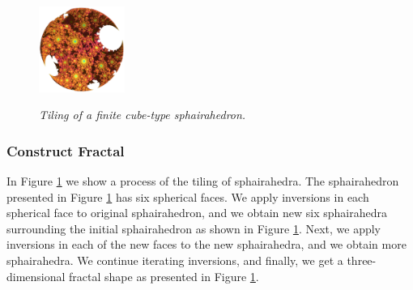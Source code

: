 \begin{figure}[H]
\begin{minipage}[t]{0.19\textwidth}
  \label{fig:sphaira-step10}
 \end{minipage}
 \hspace*{\fill}
 \begin{minipage}[t]{0.19\textwidth}
  \centering
  \includegraphics[width=1.1in, height=1.1in, keepaspectratio]{./img/application/sphairahedron/finiteProcess/final.png}
  \label{fig:sphaira-final}
 \end{minipage}
 \hspace*{\fill}
 \caption{\textit{Tiling of a finite cube-type sphairahedron.}}
 \label{fig:sphairahedronTile}
\end{figure}

\subsubsection{Construct Fractal}

In Figure \ref{fig:sphairahedronTile} we show a process of the tiling of
sphairahedra.
The sphairahedron presented in Figure
\ref{fig:sphairahedronTile} has six spherical
faces.
We apply inversions in each spherical face to original sphairahedron,
and we obtain new six sphairahedra surrounding the initial sphairahedron
as shown in Figure
\ref{fig:sphairahedronTile}.
Next, we apply inversions in each of the new faces to the new sphairahedra,
and we obtain more sphairahedra.
We continue iterating inversions, and finally, we get a three-dimensional
fractal shape as presented in Figure
\ref{fig:sphairahedronTile}.

